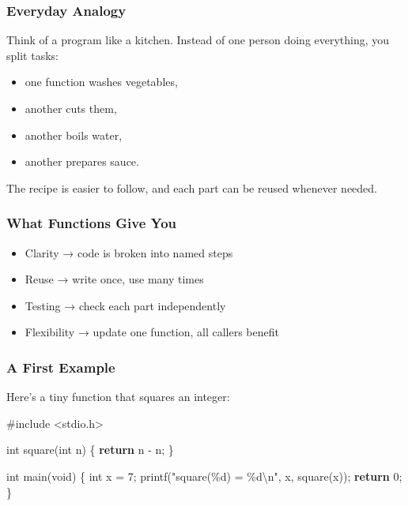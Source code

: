 \documentclass[
  letterpaper,
  DIV=11,
  numbers=noendperiod]{scrreprt}
\newenvironment{Shaded}{\begin{snugshade}}{\end{snugshade}}
\newcommand{\ControlFlowTok}[1]{\textcolor[rgb]{0.00,0.23,0.31}{\textbf{#1}}}
\newcommand{\DataTypeTok}[1]{\textcolor[rgb]{0.68,0.00,0.00}{#1}}
\newcommand{\DecValTok}[1]{\textcolor[rgb]{0.68,0.00,0.00}{#1}}
\newcommand{\ImportTok}[1]{\textcolor[rgb]{0.00,0.46,0.62}{#1}}
\newcommand{\NormalTok}[1]{\textcolor[rgb]{0.00,0.23,0.31}{#1}}
\newcommand{\OperatorTok}[1]{\textcolor[rgb]{0.37,0.37,0.37}{#1}}
\newcommand{\PreprocessorTok}[1]{\textcolor[rgb]{0.68,0.00,0.00}{#1}}
\newcommand{\SpecialCharTok}[1]{\textcolor[rgb]{0.37,0.37,0.37}{#1}}
\newcommand{\StringTok}[1]{\textcolor[rgb]{0.13,0.47,0.30}{#1}}
\providecommand{\tightlist}{%
  \setlength{\itemsep}{0pt}\setlength{\parskip}{0pt}}
\begin{document}
\subsubsection{Everyday Analogy}\label{everyday-analogy}

Think of a program like a kitchen. Instead of one person doing
everything, you split tasks:

\begin{itemize}
\tightlist
\item
  one function washes vegetables,
\item
  another cuts them,
\item
  another boils water,
\item
  another prepares sauce.
\end{itemize}

The recipe is easier to follow, and each part can be reused whenever
needed.

\subsubsection{What Functions Give You}\label{what-functions-give-you}

\begin{itemize}
\tightlist
\item
  Clarity → code is broken into named steps
\item
  Reuse → write once, use many times
\item
  Testing → check each part independently
\item
  Flexibility → update one function, all callers benefit
\end{itemize}

\subsubsection{A First Example}\label{a-first-example}

Here's a tiny function that squares an integer:

\begin{Shaded}
\begin{Highlighting}[]
\PreprocessorTok{\#include }\ImportTok{\textless{}stdio.h\textgreater{}}

\DataTypeTok{int}\NormalTok{ square}\OperatorTok{(}\DataTypeTok{int}\NormalTok{ n}\OperatorTok{)} \OperatorTok{\{}
    \ControlFlowTok{return}\NormalTok{ n }\OperatorTok{{-}}\NormalTok{ n}\OperatorTok{;}
\OperatorTok{\}}

\DataTypeTok{int}\NormalTok{ main}\OperatorTok{(}\DataTypeTok{void}\OperatorTok{)} \OperatorTok{\{}
    \DataTypeTok{int}\NormalTok{ x }\OperatorTok{=} \DecValTok{7}\OperatorTok{;}
\NormalTok{    printf}\OperatorTok{(}\StringTok{"square(}\SpecialCharTok{\%d}\StringTok{) = }\SpecialCharTok{\%d\textbackslash{}n}\StringTok{"}\OperatorTok{,}\NormalTok{ x}\OperatorTok{,}\NormalTok{ square}\OperatorTok{(}\NormalTok{x}\OperatorTok{));}
    \ControlFlowTok{return} \DecValTok{0}\OperatorTok{;}
\OperatorTok{\}}
\end{Highlighting}
\end{Shaded}
\end{document}
